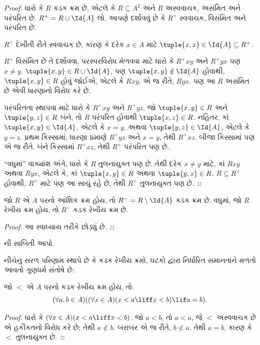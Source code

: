 \documentclass[../../../include/open-logic-section]{subfiles}
\begin{document}
\begin{proof}
ધારો કે $R$ કડક ક્રમ છે, એટલે કે $R \subseteq A^2$ અને
$R$ અસ્વવાચક, અસંમિત અને પરંપરિત છે.
$R^+ = R \cup \Id{A}$ લો. આપણે દર્શાવવું છે કે
$R^+$ સ્વવાચક, વિસંમિત અને પરંપરિત છે.

$R^+$ દેખીતી રીતે સ્વવાચક છે, કારણ કે દરેક $x \in A$
માટે $\tuple{x, x} \in \Id{A} \subseteq R^+$.

$R^+$ વિસંમિત છે તે દર્શાવવા, પરસ્પરવિરોધ મેળવવા માટે ધારો કે
$R^+xy$ અને $R^+yx$ પણ $x \neq y$.
$\tuple{x,y} \in R \cup \Id{A}$, પણ
$\tuple{x, y} \notin \Id{A}$ હોવાથી,
$\tuple{x, y} \in R$ હોવું જોઈએ, એટલે કે $Rxy$.
એ જ રીતે, $Ryx$. પણ આ $R$ અસંમિત છે એવી ધારણાનો વિરોધ કરે છે.

પરંપરિતતા સ્થાપવા માટે ધારો કે $R^+xy$ અને $R^+yz$.
જો $\tuple{x, y} \in R$ અને $\tuple{y,z} \in R$ બંને,
તો $R$ પરંપરિત હોવાથી $\tuple{x, z} \in R$.
નહિતર, કાં $\tuple{x, y} \in \Id{A}$, એટલે કે $x = y$,
અથવા $\tuple{y, z} \in \Id{A}$, એટલે કે $y = z$.
પ્રથમ કિસ્સામાં, ધારણા પ્રમાણે $R^+yz$ અને $x = y$,
તેથી $R^+xz$. બીજા કિસ્સામાં પણ એ જ રીતે.
બંને કિસ્સામાં $R^+xz$, તેથી $R^+$ પરંપરિત પણ છે.

“વધુમાં” વાક્યાંશ અંગે, ધારો કે $R$ તુલનાયુક્ત પણ છે.
તેથી દરેક $x \neq y$ માટે, કાં $Rxy$ અથવા $Ryx$,
એટલે કે, કાં $\tuple{x, y} \in R$ અથવા $\tuple{y, x} \in R$.
$R \subseteq R^+$ હોવાથી, $R^+$ માટે પણ આ સાચું રહે છે,
તેથી $R^+$ તુલનાયુક્ત પણ છે.
\end{proof}

\begin{prop}
જો $R$ એ $A$ પરનો આંશિક ક્રમ હોય, તો
$R^- = R \setminus \Id{A}$ કડક ક્રમ છે.
વધુમાં, જો $R$ રેખીય ક્રમ હોય, તો $R^-$ કડક રેખીય ક્રમ છે.
\end{prop}

\begin{proof}
આ સ્વાધ્યાય તરીકે છોડ્યું છે.
\end{proof}

\begin{prob}
ની સાબિતી આપો.
\end{prob}

નીચેનું સરળ પરિણામ સ્થાપે છે કે કડક રેખીય ક્રમો,
ઘટકો દ્વારા નિર્ધારિત સમાનતાને મળતો આવતો ગુણધર્મ સંતોષે છે:

\begin{prop}
જો $<$ એ $A$ પરનો કડક રેખીય ક્રમ હોય, તો:
\[
  (\forall a, b \in A)((\forall x \in A)(x < a \liff x < b) \lif a = b).
\]
\end{prop}

\begin{proof}
ધારો કે $(\forall x \in A)(x < a \liff x < b)$.
જો $a < b$, તો $a < a$, જે $<$ અસ્વવાચક છે એ હકીકતનો
વિરોધ કરે છે; તેથી $a \nless b$. બરાબર એ જ રીતે,
$b \nless a$. તેથી $a = b$, કારણ કે $<$ તુલનાયુક્ત છે.
\end{proof}
\end{document}
